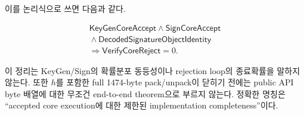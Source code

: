 이를 논리식으로 쓰면 다음과 같다.

\[
\begin{gathered}
  \mathsf{KeyGenCoreAccept}\land \mathsf{SignCoreAccept}\\
  {}\land \mathsf{DecodedSignatureObjectIdentity}\\
  {}\Longrightarrow \mathsf{VerifyCoreReject}=0.
\end{gathered}
\]

\begin{scopeboundary}
이 정리는 KeyGen/Sign의 확률분포 동등성이나 rejection loop의 종료확률을
말하지 않는다. 또한 \(h\)를 포함한 full 1474-byte pack/unpack이 닫히기 전에는
public API byte 배열에 대한 무조건 end-to-end theorem으로 부르지 않는다.
정확한 명칭은 ``accepted core execution에 대한 제한된 implementation
completeness''이다.
\end{scopeboundary}
